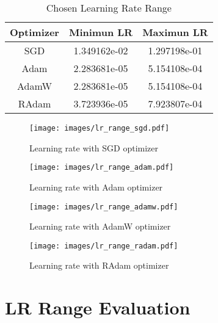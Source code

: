 \documentclass{article}
\begin{document}
\begin{table}[ht!]
    \centering
    \caption{Chosen Learning Rate Range}\label{tab:lr_range}
    \begin{tabular}{ccc}
        \toprule
        Optimizer & Minimun LR   & Maximun LR   \\
        \midrule
        SGD       & 1.349162e-02 & 1.297198e-01 \\
        Adam      & 2.283681e-05 & 5.154108e-04 \\
        AdamW     & 2.283681e-05 & 5.154108e-04 \\
        RAdam     & 3.723936e-05 & 7.923807e-04 \\
        \bottomrule
    \end{tabular}
\end{table}

\begin{figure}[ht!]
    \centering
    \texttt{[image: images/lr\_range\_sgd.pdf]}
    \caption{Learning rate with SGD optimizer}\label{fig:lr_range_sgd}
\end{figure}

\begin{figure}[ht!]
    \centering
    \texttt{[image: images/lr\_range\_adam.pdf]}
    \caption{Learning rate with Adam optimizer}\label{fig:lr_range_adam}
\end{figure}

\begin{figure}[ht!]
    \centering
    \texttt{[image: images/lr\_range\_adamw.pdf]}
    \caption{Learning rate with AdamW optimizer}\label{fig:lr_range_adamw}
\end{figure}

\begin{figure}[ht!]
    \centering
    \texttt{[image: images/lr\_range\_radam.pdf]}
    \caption{Learning rate with RAdam optimizer}\label{fig:lr_range_radam}
\end{figure}

\clearpage
\section{LR Range Evaluation}
\end{document}
